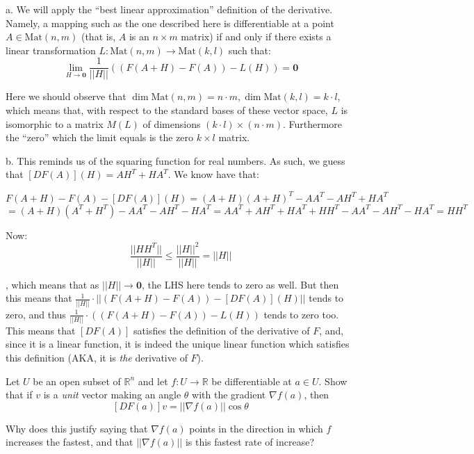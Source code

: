 \begin{solution}

    a. We will apply the ``best linear approximation'' definition of the derivative. Namely, a mapping such as the one described here is differentiable at a point $A \in \text{Mat}(n, m)$ (that is, $A$ is an $n \times m$ matrix) if and only if there exists a linear transformation $L: \text{Mat}(n, m) \rightarrow \text{Mat}(k, l)$  such that:
    $$\lim_{H \rightarrow \textbf{0}} \frac{1}{\lvert \lvert H \rvert \rvert}( (F(A + H) - F(A)) - L(H)) = \textbf{0}$$

    Here we should observe that $\dim \text{Mat}(n, m) = n \cdot m, \dim \text{Mat}(k, l) = k \cdot l$, which means that, with respect to the standard bases of these vector space, $L$ is isomorphic to a matrix $M(L)$ of dimensions $(k \cdot l) \times (n \cdot m)$. Furthermore the ``zero'' which the limit equals is the zero $k \times l$ matrix.

    b. This reminds us of the squaring function for real numbers. As such, we guess that $[D F(A)] (H) = AH^T + HA^T$. We know have that:

    $$F(A+H) - F(A) - [DF(A)](H) = (A+H)(A+H)^T - AA^T - AH^T + HA^T$$
    $$= (A+H)(A^T + H^T) - AA^T - AH^T - HA^T = AA^T + AH^T + HA^T + HH^T - AA^T - AH^T - HA^T = HH^T$$

    Now:
    $$\frac{\lvert \lvert H H^T \rvert \rvert}{\lvert \lvert H \rvert \rvert} \leq \frac{\lvert \lvert H \rvert \rvert^2}{\lvert \lvert H \rvert \rvert} = \lvert \lvert H \rvert \rvert$$

    , which means that as $\lvert \lvert H \rvert \rvert \rightarrow \textbf{0}$, the LHS here tends to zero as well. But then this means that $\frac{1}{\lvert \lvert H \rvert \rvert} \cdot \lvert \lvert (F(A+H) - F(A)) - [DF(A)](H) \rvert \rvert$ tends to zero, and thus $\frac{1}{\lvert \lvert H \rvert \rvert} \cdot ( (F(A+H) - F(A)) - L(H) )$ tends to zero too. This means that $[DF(A)]$ satisfies the definition of the derivative of $F$, and, since it is a linear function, it is indeed the unique linear function which satisfies this definition (AKA, it is \textit{the} derivative of $F$).
\end{solution}

\begin{exercise}{18}
    Let $U$ be an open subset of $\mathbb{R}^n$ and let $f: U \rightarrow \mathbb{R}$ be differentiable at $a \in U$. Show that if $v$ is a \textit{unit} vector making an angle $\theta$ with the gradient $\nabla f(a)$, then 
    $$[DF(a)]v = \lvert \lvert \nabla f(a) \rvert \rvert \cos \theta$$

    Why does this justify saying that $\nabla f(a)$ points in the direction in which $f$ increases the fastest, and that $\lvert \lvert \nabla f(a) \rvert \rvert$ is this fastest rate of increase?
\end{exercise}

